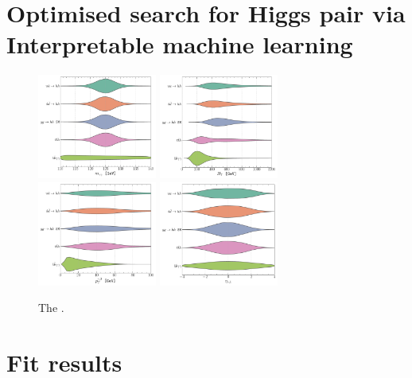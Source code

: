 \section{Optimised search for Higgs pair via Interpretable machine learning \label{sec:mlanalysisly}}
\begin{figure}[t]
	\centering
	\includegraphics[width=0.35\textwidth]{fig/shape-MAA} 	\hspace*{0.25 cm}
	\includegraphics[width=0.35\textwidth]{fig/shape-HT}  \\
	\includegraphics[width=0.35\textwidth]{fig/shape-PTA2} \hspace*{0.25 cm}
	\includegraphics[width=0.35\textwidth]{fig/shape-ETAa1} 
	\caption{The . }
	\label{fig:voilen}
\end{figure}  

\section{Fit results\label{sec:resultsly}}
